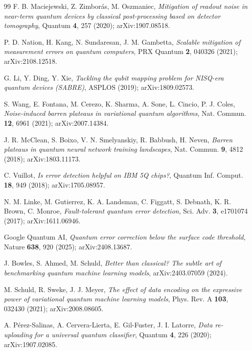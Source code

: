 \documentclass[11pt,a4paper]{article}
\begin{document}
\begin{thebibliography}{99}
F. B. Maciejewski, Z. Zimborás, M. Oszmaniec, \emph{Mitigation of readout noise in
near-term quantum devices by classical post-processing based on detector tomography},
Quantum \textbf{4}, 257 (2020); arXiv:1907.08518.

P. D. Nation, H. Kang, N. Sundaresan, J. M. Gambetta, \emph{Scalable mitigation of
measurement errors on quantum computers}, PRX Quantum \textbf{2}, 040326 (2021);
arXiv:2108.12518.

G. Li, Y. Ding, Y. Xie, \emph{Tackling the qubit mapping problem for NISQ-era quantum
devices (SABRE)}, ASPLOS (2019); arXiv:1809.02573.

S. Wang, E. Fontana, M. Cerezo, K. Sharma, A. Sone, L. Cincio, P. J. Coles,
\emph{Noise-induced barren plateaus in variational quantum algorithms}, Nat. Commun.
\textbf{12}, 6961 (2021); arXiv:2007.14384.

J. R. McClean, S. Boixo, V. N. Smelyanskiy, R. Babbush, H. Neven, \emph{Barren plateaus
in quantum neural network training landscapes}, Nat. Commun. \textbf{9}, 4812 (2018);
arXiv:1803.11173.

C. Vuillot, \emph{Is error detection helpful on IBM 5Q chips?}, Quantum Inf. Comput.
\textbf{18}, 949 (2018); arXiv:1705.08957.

N. M. Linke, M. Gutierrez, K. A. Landsman, C. Figgatt, S. Debnath, K. R. Brown,
C. Monroe, \emph{Fault-tolerant quantum error detection}, Sci. Adv. \textbf{3},
e1701074 (2017); arXiv:1611.06946.

Google Quantum AI, \emph{Quantum error correction below the surface code threshold},
Nature \textbf{638}, 920 (2025); arXiv:2408.13687.

J. Bowles, S. Ahmed, M. Schuld, \emph{Better than classical? The subtle art of
benchmarking quantum machine learning models}, arXiv:2403.07059 (2024).

M. Schuld, R. Sweke, J. J. Meyer, \emph{The effect of data encoding on the expressive
power of variational quantum machine learning models}, Phys. Rev. A \textbf{103},
032430 (2021); arXiv:2008.08605.

A. Pérez-Salinas, A. Cervera-Lierta, E. Gil-Fuster, J. I. Latorre, \emph{Data
re-uploading for a universal quantum classifier}, Quantum \textbf{4}, 226 (2020);
arXiv:1907.02085.

\end{thebibliography}
\end{document}
